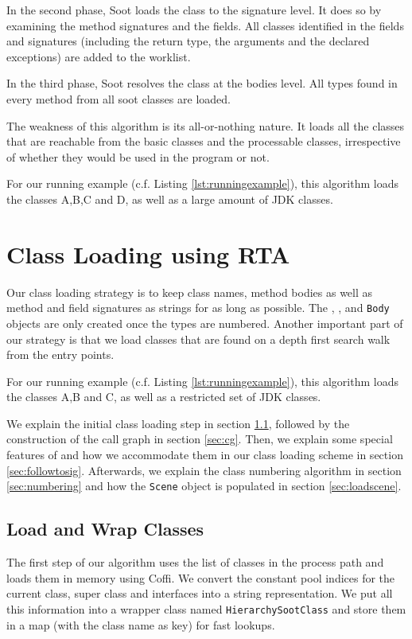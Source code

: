 \documentclass{sigplanconf}
\begin{document}
In the second phase, Soot loads the class to the signature level. It does so by examining the method signatures and the fields. All classes identified in the fields and signatures (including the return type, the arguments and the declared exceptions) are added to the worklist.

In the third phase, Soot resolves the class at the bodies level. All types found in every method from all soot classes are loaded.

The weakness of this algorithm is its all-or-nothing nature. It loads all the classes that are reachable from the basic classes and the processable classes, irrespective of whether they would be used in the program or not.

For our running example (c.f. Listing \ref{lst:runningexample}), this algorithm loads the classes A,B,C and D, as well as a large amount of JDK classes.

\section{Class Loading using RTA}
\label{sec:new-cl}
Our class loading strategy is to keep class names, method bodies as well as method and field signatures as strings for as long as possible.
The \sootclass, \sootmethod, \sootfield and {\tt Body} objects are only created once the types are numbered. Another important part of our strategy is that we load classes that are found on a depth first search walk from the entry points.

For our running example (c.f. Listing \ref{lst:runningexample}), this algorithm loads the classes A,B and C, as well as a restricted set of JDK classes. %

We explain the initial class loading step in section \ref{sec:loading}, followed by the construction of the call graph in section \ref{sec:cg}. Then, we explain some special features of \rb and how we accommodate them in our class loading scheme in section \ref{sec:followtosig}. Afterwards, we explain the class numbering algorithm in section \ref{sec:numbering} and how the {\tt Scene} object is populated in section \ref{sec:loadscene}.

\subsection{Load and Wrap Classes}
\label{sec:loading}
The first step of our algorithm uses the list of classes in the process path and loads them in memory using Coffi. We convert the constant pool indices for the current class, super class and interfaces into a string representation. We put all this information into a wrapper class named {\tt HierarchySootClass} and store them in a map (with the class name as key) for fast lookups.
\end{document}

